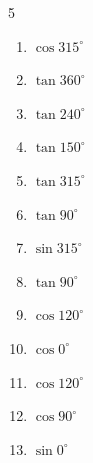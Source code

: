 \begin{multicols}{5}
\begin{enumerate}
  \item $\displaystyle \cos{315^\circ}$


  \item $\displaystyle \tan{360^\circ}$

        \phantom{$\displaystyle =0$}

  \item $\displaystyle \tan{240^\circ}$


  \item $\displaystyle \tan{150^\circ}$


  \item $\displaystyle \tan{315^\circ}$

        \phantom{$\displaystyle =-1$}

\columnbreak %

  \item $\displaystyle \tan{90^\circ}$

        \phantom{$\displaystyle なし$}

  \item $\displaystyle \sin{315^\circ}$


  \item $\displaystyle \tan{90^\circ}$

        \phantom{$\displaystyle なし$}

  \item $\displaystyle \cos{120^\circ}$


  \item $\displaystyle \cos{0^\circ}$

        \phantom{$\displaystyle =1$}

  \item $\displaystyle \cos{120^\circ}$


  \item $\displaystyle \cos{90^\circ}$

        \phantom{$\displaystyle =0$}

  \item $\displaystyle \sin{0^\circ}$


\end{enumerate}
\end{multicols}
